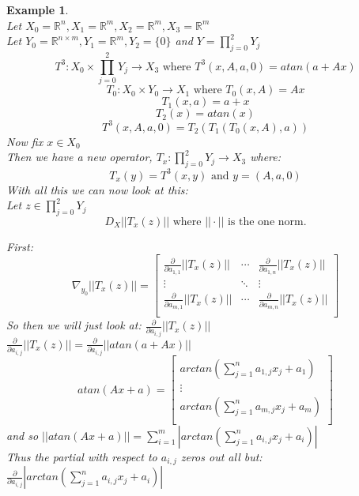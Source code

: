 \documentclass[12pt]{extarticle}
\theoremstyle{plain}
\theoremstyle{Definition}
\theoremstyle{Definition}
\theoremstyle{plain}
\newtheorem{exmp}{Example}[section]
\begin{document}
\begin{exmp} \textbf{} \\
Let $X_0 = \mathbb{R}^n, X_1 = \mathbb{R}^m, X_2 = \mathbb{R}^m, X_3 = \mathbb{R}^m$ \\
Let $Y_0 = \mathbb{R}^{n\times m}, Y_1 = \mathbb{R}^m, Y_2 = \{0\}$ and $Y = \prod_{j=0}^{2} Y_j$ 
$$T^3 : X_0 \times \prod_{j=0}^{2} Y_j \to X_3  \text{ where } T^3(x,A,a,0) = atan(a + Ax)$$ 
$$T_0 : X_0 \times Y_0 \to X_1 \text{ where } T_0(x,A) = Ax$$ 
$$T_1(x,a) = a+x$$ 
$$T_2(x) = atan(x)$$ 
$$T^3(x,A,a,0) = T_2(T_1(T_0(x,A),a) )$$ 
Now fix $x \in X_0$ \\ 
Then we have a new operator, $T_x : \prod_{j=0}^{2} Y_j \to X_3$ where: \\ 
$$T_x(y) = T^3(x,y) \text{ and } y = (A,a,0)$$
With all this we can now look at this: \\ 
Let $z \in \prod_{j=0}^{2} Y_j$ 
$$D_X ||T_x(z)|| \text{ where } ||\cdot|| \text{ is the one norm.}$$

First: \\ 
\[
\nabla_{y_0} ||T_x(z)|| = 
\begin{bmatrix}
\frac{\partial}{\partial a_{1,1}} ||T_x(z)|| & \cdots & \frac{\partial}{\partial a_{1,n}} ||T_x(z)|| \\
\vdots & \ddots & \vdots \\ 
\frac{\partial}{\partial a_{m,1}} ||T_x(z)|| & \cdots & \frac{\partial}{\partial a_{m,n}} ||T_x(z)|| \\
\end{bmatrix}
\]
So then we will just look at: $\frac{\partial}{\partial a_{i,j}} ||T_x(z)||$ \\ 
$\frac{\partial}{\partial a_{i,j}} ||T_x(z)|| = \frac{\partial}{\partial a_{i,j}} ||atan(a + Ax)||$ \\
\[
atan(Ax +a) = 
\begin{bmatrix}
arctan(\sum_{j=1}^n a_{1,j}x_j + a_1)\\ 
\vdots \\ 
arctan(\sum_{j=1}^n a_{m,j}x_j + a_m)\\ 
\end{bmatrix}
\]
and so $||atan(Ax +a)|| = \sum_{i=1}^m | arctan(\sum_{j=1}^n a_{i,j}x_j + a_i)|$ \\
Thus the partial with respect to $a_{i,j}$ zeros out all but: \\
$\frac{\partial}{\partial a_{i,j}}| arctan(\sum_{j=1}^n a_{i,j}x_j + a_i)|$
\end{exmp}
\end{document}
